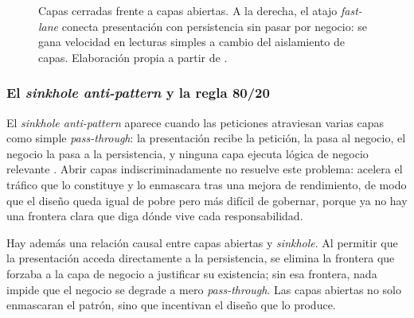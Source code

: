 \begin{figure}[H]
  \caption{Capas cerradas frente a capas abiertas. A la derecha, el atajo \emph{fast-lane} conecta presentación con persistencia sin pasar por negocio: se gana velocidad en lecturas simples a cambio del aislamiento de capas. Elaboración propia a partir de \parencite{richards2020fundamentals,richards2015patterns}.}
  \label{fig:capas-abiertas}
\end{figure}

\subsubsection{El \emph{sinkhole anti-pattern} y la regla 80/20}
El \emph{sinkhole anti-pattern} aparece cuando las peticiones atraviesan varias capas como simple \emph{pass-through}: la presentación recibe la petición, la pasa al negocio, el negocio la pasa a la persistencia, y ninguna capa ejecuta lógica de negocio relevante \parencite{richards2015patterns}. Abrir capas indiscriminadamente no resuelve este problema: acelera el tráfico que lo constituye y lo enmascara tras una mejora de rendimiento, de modo que el diseño queda igual de pobre pero más difícil de gobernar, porque ya no hay una frontera clara que diga dónde vive cada responsabilidad.

Hay además una relación causal entre capas abiertas y \emph{sinkhole}. Al permitir que la presentación acceda directamente a la persistencia, se elimina la frontera que forzaba a la capa de negocio a justificar su existencia; sin esa frontera, nada impide que el negocio se degrade a mero \emph{pass-through}. Las capas abiertas no solo enmascaran el patrón, sino que incentivan el diseño que lo produce.

